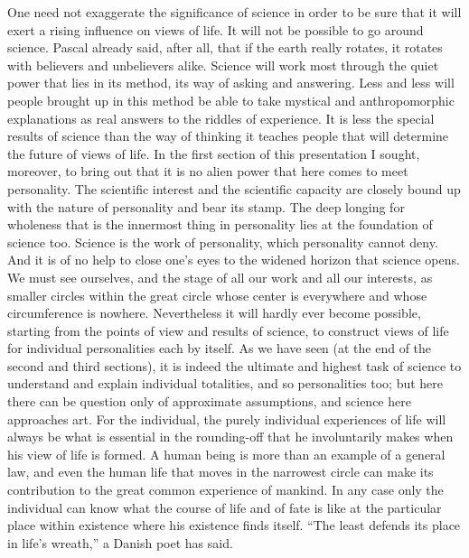 \documentclass[12pt]{article}
\newcommand{\opage}[1]{\marginnote{\footnotesize\textit{[#1]}}}
\begin{document}
One need not exaggerate the significance of
\opage{63}%
science in order to be sure that it will exert a rising influence on views of
life. It will not be possible to go around science. Pascal already said, after
all, that if the earth really rotates, it rotates with believers and
unbelievers alike. Science will work most through the quiet power that lies in
its method, its way of asking and answering. Less and less will people brought
up in this method be able to take mystical and anthropomorphic explanations as
real answers to the riddles of experience. It is less the special results of
science than the way of thinking it teaches people that will determine the
future of views of life. In the first section of this presentation I sought,
moreover, to bring out that it is no alien power that here comes to meet
personality. The scientific interest and the scientific capacity are closely
bound up with the nature of personality and bear its stamp. The deep longing
for wholeness that is the innermost thing in personality lies at the foundation
of science too. Science is the work of personality, which personality cannot
deny. And it is of no help to close one's eyes to the
\opage{64}%
widened horizon that science opens. We must see ourselves, and the stage of all
our work and all our interests, as smaller circles within the great circle whose
center is everywhere and whose circumference is nowhere. Nevertheless it will
hardly ever become possible, starting from the points of view and results of
science, to construct views of life for individual personalities each by
itself. As we have seen (at the end of the second and third sections), it is
indeed the ultimate and highest task of science to understand and explain
individual totalities, and so personalities too; but here there can be question
only of approximate assumptions, and science here approaches art. For the
individual, the purely individual experiences of life will always be what is
essential in the rounding-off that he involuntarily makes when his view of life
is formed. A human being is more than an example of a general law, and even the
human life that moves in the narrowest circle can make its contribution to the
great common experience of mankind. In any case only the individual can know
what the course of life and of fate is like at the particular place within
\opage{65}%
existence where his existence finds itself. ``The least defends its place in
life's wreath,'' a Danish poet has said.
\end{document}
